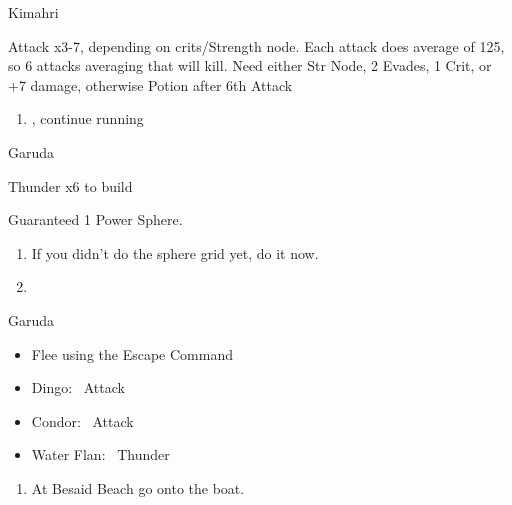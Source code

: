 \begin{battle}[750]{Kimahri}
	\begin{itemize}
		\tidusf Attack x3-7, depending on crits/Strength node.
		\tidusf Each attack does average of 125, so 6 attacks averaging that will kill.
		\tidusf Need either Str Node, 2 Evades, 1 Crit, or +7 damage, otherwise Potion after 6th Attack
	\end{itemize}
\end{battle}
\begin{enumerate}[resume]
	\item \sd, continue running
\end{enumerate}
\begin{battle}{Garuda}
	\begin{itemize}
		\summon{\valefor}
		\valeforf Thunder x6 to build \od
	\end{itemize}
	Guaranteed 1 Power Sphere.
\end{battle}
\begin{enumerate}[resume]
	\item If you didn't do the sphere grid yet, do it now.
	\item \formation{\tidus}{\yuna}{\lulu}
\end{enumerate}
\begin{battle}{Garuda}
	\begin{itemize}
		\item Flee using the Escape Command
	\end{itemize}
\end{battle}
\begin{encounters}
	\begin{itemize}
		\item Dingo: \tidus\ Attack
		\item Condor: \wakka\ Attack
		\item Water Flan: \lulu\ Thunder
	\end{itemize}
\end{encounters}
\begin{enumerate}[resume]
	\item At Besaid Beach go onto the boat.
\end{enumerate}